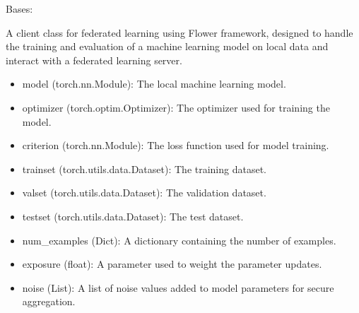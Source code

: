 \documentclass[letterpaper,10pt,english]{sphinxmanual}
\begin{document}
\begin{fulllineitems}
\label{\detokenize{insur_FL_client:insur_FL_client.ClaimsFrequencyFLClient}}
\pysigstartsignatures
{}
\pysigstopsignatures
\sphinxAtStartPar
Bases: 

\sphinxAtStartPar
A client class for federated learning using Flower framework, designed to handle the training and evaluation 
of a machine learning model on local data and interact with a federated learning server.
\begin{description}
\begin{itemize}
\item {} 
\sphinxAtStartPar
model (torch.nn.Module): The local machine learning model.

\item {} 
\sphinxAtStartPar
optimizer (torch.optim.Optimizer): The optimizer used for training the model.

\item {} 
\sphinxAtStartPar
criterion (torch.nn.Module): The loss function used for model training.

\item {} 
\sphinxAtStartPar
trainset (torch.utils.data.Dataset): The training dataset.

\item {} 
\sphinxAtStartPar
valset (torch.utils.data.Dataset): The validation dataset.

\item {} 
\sphinxAtStartPar
testset (torch.utils.data.Dataset): The test dataset.

\item {} 
\sphinxAtStartPar
num\_examples (Dict): A dictionary containing the number of examples.

\item {} 
\sphinxAtStartPar
exposure (float): A parameter used to weight the parameter updates.

\item {} 
\sphinxAtStartPar
noise (List): A list of noise values added to model parameters for secure aggregation.


\end{itemize}
\end{description}
\end{fulllineitems}
\end{document}
